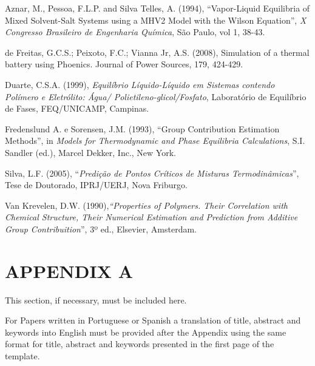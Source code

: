 \documentclass[12pt,fleqn]{article}
\begin{document}
\begin{thebibliography}{99}
\fontsize{11}{0}\selectfont
{}
Aznar, M., Pessoa, F.L.P. and Silva Telles, A. (1994), ``Vapor-Liquid
Equilibria of Mixed Solvent-Salt Systems using a MHV2 Model with the Wilson
Equation'', {\em X Congresso Brasileiro de Engenharia Química}, São Paulo, vol
1, 38-43.

de Freitas, G.C.S.; Peixoto, F.C.; Vianna Jr, A.S. (2008), Simulation of a
thermal battery using Phoenics. Journal of Power Sources, 179, 424-429.

Duarte, C.S.A. (1999), {\em Equilíbrio Líquido-Líquido em Sistemas contendo
Polímero e Eletrólito: Água/ Polietileno-glicol/Fosfato}, Laboratório de
Equilíbrio de Fases, FEQ/UNICAMP, Campinas.

Fredenslund A. e Sorensen, J.M. (1993), ``Group Contribution Estimation
Methods'', in {\em  Models for Thermodynamic and Phase Equilibria
Calculations}, S.I. Sandler (ed.), Marcel Dekker, Inc., New York.

Silva, L.F. (2005), ``{\em Predição de Pontos Críticos de Misturas
Termodinâmicas}'', Tese de Doutorado, IPRJ/UERJ, Nova Friburgo.

Van Krevelen, D.W. (1990),{\em ``Properties of Polymers. Their Correlation with
Chemical Structure, Their Numerical Estimation and Prediction from Additive
Group Contribuition}'', 3º ed., Elsevier, Amsterdam.
\end{thebibliography}
\vspace*{-0.1cm}
\section*{APPENDIX A}
This section, if necessary, must be included here.

\vspace{0.5cm} %

For Papers written in Portuguese or Spanish a translation of title, abstract
and keywords into English must be provided after the Appendix using the same
format for title, abstract and keywords presented in the first page of the
template.





\end{document}

